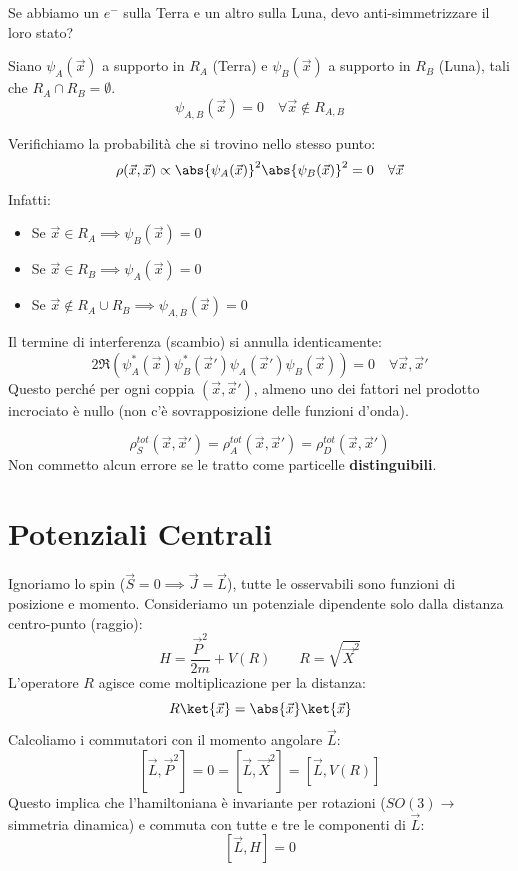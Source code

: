 \begin{example}
    Se abbiamo un \(e^-\) sulla Terra e un altro sulla Luna, devo anti-simmetrizzare il loro stato?

Siano \(\psi_A(\vec{x})\) a supporto in \(R_A\) (Terra) e \(\psi_B(\vec{x})\) a supporto in \(R_B\) (Luna), tali che \(R_A \cap R_B = \emptyset\).
\[
    \psi_{A,B}(\vec{x}) = 0 \quad \forall \vec{x} \notin R_{A,B}
\]

Verifichiamo la probabilità che si trovino nello stesso punto:
\[
    \rho(\vec{x}, \vec{x}) \propto \abs{\psi_A(\vec{x})}^2 \abs{\psi_B(\vec{x})}^2 = 0 \quad \forall \vec{x}
\]
Infatti:
\begin{itemize}
    \item Se \(\vec{x} \in R_A \implies \psi_B(\vec{x}) = 0\)
    \item Se \(\vec{x} \in R_B \implies \psi_A(\vec{x}) = 0\)
    \item Se \(\vec{x} \notin R_A \cup R_B \implies \psi_{A,B}(\vec{x}) = 0\)
\end{itemize}

Il termine di interferenza (scambio) si annulla identicamente:
\[
    2\Re \left( \psi_A^*(\vec{x})\psi_B^*(\vec{x}') \psi_A(\vec{x}')\psi_B(\vec{x}) \right) = 0 \quad \forall \vec{x}, \vec{x}'
\]
Questo perché per ogni coppia \((\vec{x}, \vec{x}')\), almeno uno dei fattori nel prodotto incrociato è nullo (non c'è sovrapposizione delle funzioni d'onda).

\[
    \rho_S^{tot}(\vec{x}, \vec{x}') = \rho_A^{tot}(\vec{x}, \vec{x}') = \rho_D^{tot}(\vec{x}, \vec{x}')
\]
Non commetto alcun errore se le tratto come particelle \textbf{distinguibili}.
\end{example}


\section{Potenziali Centrali}

Ignoriamo lo spin (\( \vec{S}=0 \implies \vec{J}=\vec{L} \)), tutte le osservabili sono funzioni di posizione e momento. Consideriamo un potenziale dipendente solo dalla distanza centro-punto (raggio):
\[
H = \frac{\vec{P}^2}{2m} + V(R) \qquad R = \sqrt{\vec{X}^2}
\]
L'operatore \( R \) agisce come moltiplicazione per la distanza:
\[
R\ket{\vec{x}} = \abs{\vec{x}}\ket{\vec{x}}
\]
Calcoliamo i commutatori con il momento angolare \( \vec{L} \):
\[
[\vec{L}, \vec{P}^2] = 0 = [\vec{L}, \vec{X}^2] = [\vec{L}, V(R)]
\]
Questo implica che l'hamiltoniana è invariante per rotazioni (\( SO(3) \to \) simmetria dinamica) e commuta con tutte e tre le componenti di \( \vec{L} \):
\[
[\vec{L}, H] = 0
\]

